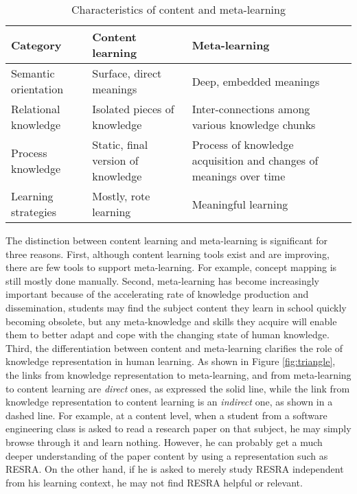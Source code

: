 \small
\begin{table}[hbt]
    \caption{Characteristics of content and meta-learning}
    \begin{center}
    \begin{tabular} {||l|p{1.9in}|p{1.9in}||} \hline   
      {\bf Category} & {\bf Content learning} & {\bf Meta-learning}
      \\ \hline \hline
      
      Semantic orientation & Surface, direct meanings & Deep,
      embedded meanings \\ \hline
      
      Relational knowledge & Isolated pieces of knowledge &
      Inter-connections among various knowledge chunks \\ \hline
      
      Process knowledge & Static, final version of knowledge &
      Process of knowledge acquisition and changes of meanings over
      time \\ \hline
      
      Learning strategies & Mostly, rote learning & Meaningful
      learning \\ \hline
    \end{tabular}
    \end{center}
    \label{tab:meta-learning}
\end{table}
\normalsize
{}

The distinction between content learning and meta-learning is significant
for three reasons. First, although content learning tools exist and are
improving, there are few tools to support meta-learning. For example,
concept mapping is still mostly done manually.  Second, meta-learning has
become increasingly important because of the accelerating rate of knowledge
production and dissemination, students may find the subject content they
learn in school quickly becoming obsolete, but any meta-knowledge and
skills they acquire will enable them to better adapt and cope with the
changing state of human knowledge. Third, the differentiation between
content and meta-learning clarifies the role of knowledge representation
in human learning. As shown in Figure \ref{fig:triangle}, the links from
knowledge representation to meta-learning, and from meta-learning to
content learning are {\it direct\/} ones, as expressed the solid line,
while the link from knowledge representation to content learning is an {\it
indirect\/} one, as shown in a dashed line. For example, at a content
level, when a student from a software engineering class is asked to read a
research paper on that subject, he may simply browse through it and learn
nothing. However, he can probably get a much deeper understanding of the
paper content by using a representation such as RESRA. On the other hand,
if he is asked to merely study RESRA independent from his learning context,
he may not find RESRA helpful or relevant.

